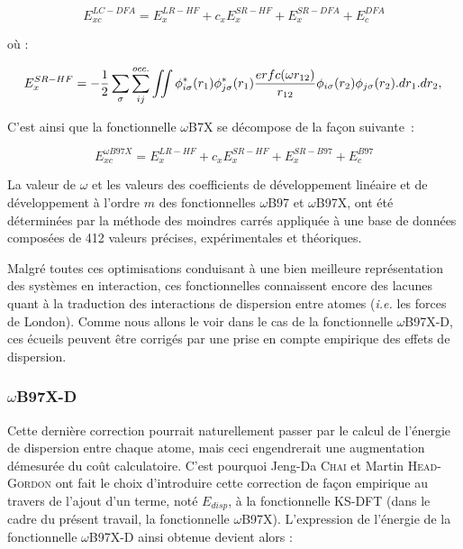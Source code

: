 	\begin{equation}
	E_{xc}^{LC-DFA} = E_{x}^{LR-HF} + c_{x}E_{x}^{SR-HF} + E_{x}^{SR-DFA} + E_{c}^{DFA}
	\end{equation}
	
	\noindent où :
	
	\begin{equation}
	E_{x}^{SR-HF} = -\frac{1}{2} \sum_{\sigma} \sum_{ij}^{occ.} \iint \phi_{i \sigma}^{*}(r_{1}) \phi_{j \sigma}^{*}(r_{1}) \frac{erfc(\omega r_{12})}{r_{12}} \phi_{i \sigma}(r_{2}) \phi_{j \sigma}(r_{2}).dr_{1}.dr_{2}, \\
	\end{equation}
	
	C'est ainsi que la fonctionnelle $\omega$B7X\cite{chai2008long} se décompose de la façon suivante~:
	
	\begin{equation}
	E_{xc}^{\omega B97X} = E_{x}^{LR-HF} + c_{x}E_{x}^{SR-HF} + E_{x}^{SR-B97} + E_{c}^{B97}
	\end{equation}
	
	La valeur de $\omega$ et les valeurs des coefficients de développement linéaire et de développement à l'ordre $m$ des fonctionnelles $\omega$B97 et $\omega$B97X, ont été déterminées par la méthode des moindres carrés appliquée à une base de données composées de 412 valeurs précises, expérimentales et théoriques.
	
	Malgré toutes ces optimisations conduisant à une bien meilleure représentation des systèmes en interaction, ces fonctionnelles connaissent encore des lacunes quant à la traduction des interactions de dispersion entre atomes (\textit{i.e.} les forces de London). Comme nous allons le voir dans le cas de la fonctionnelle $\omega$B97X-D, ces écueils peuvent être corrigés par une prise en compte empirique des effets de dispersion.
	
	\subsubsection{$\omega$B97X-D}
	
	Cette dernière correction pourrait naturellement passer par le calcul de l'énergie de dispersion entre chaque atome, mais ceci engendrerait une augmentation démesurée du coût calculatoire. C'est pourquoi Jeng-Da \textsc{Chai} et Martin \textsc{Head-Gordon} ont fait le choix d'introduire cette correction de façon empirique au travers de l'ajout d'un terme, noté $E_{disp}$, à la fonctionnelle KS-DFT (dans le cadre du présent travail, la fonctionnelle $\omega$B97X). L'expression de l'énergie de la fonctionnelle $\omega$B97X-D \cite{chai2008long} ainsi obtenue devient alors :
	
